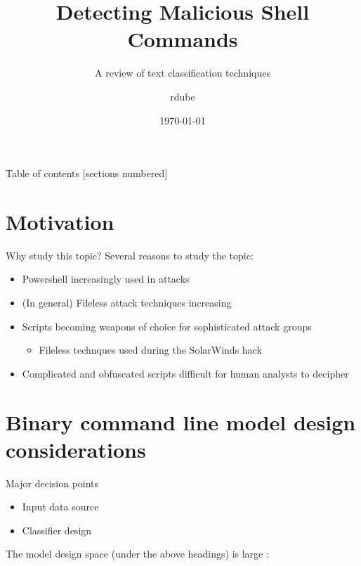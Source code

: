 \documentclass[10pt]{beamer}
\title{Detecting Malicious Shell Commands}
\subtitle{A review of text classification techniques}
\date{\today}
\author{rdube}
\begin{document}
\maketitle

\begin{frame}{Table of contents}
  [sections numbered]
  \tableofcontents[hideallsubsections]
\end{frame}

\section{Motivation}

\begin{frame}[fragile]{Why study this topic?}
	Several reasons to study the topic:
	\begin{itemize}
		\item Powershell increasingly used in attacks \cite{symc2016}
		\item (In general) Fileless attack techniques increasing \cite{symc2017}
		\item Scripts becoming weapons of choice for sophisticated attack groups \cite{msft2017-2}
		\begin{itemize}
			\item Fileless technques used during the SolarWinds hack \cite{zdnet2021}
		\end{itemize}
		\item Complicated and obfuscated scripts difficult for human analysts to decipher \cite{feye2018}
	\end{itemize}
\end{frame}

\section{Binary command line model design considerations}

\begin{frame}[fragile]{Major decision points}
	\begin{itemize}
		\item Input data source
		\item Classifier design
	\end{itemize}

	The model design space (under the above headings) is large \cite{survey2021,msft2017,powershell2018,amsi2019,feye2018,feye2018-2,textcnn2016,textcnn2019}:
\end{frame}
\end{document}
